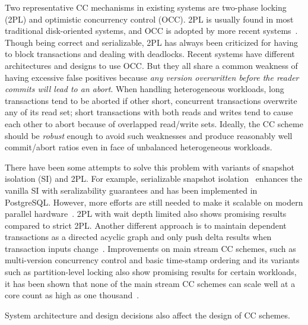 \documentclass[preprint]{sig-alternate-nocprt}
\begin{document}
Two representative CC mechanisms in existing systems are two-phase locking (2PL) and optimistic concurrency control (OCC). 2PL is usually found in most traditional disk-oriented systems, and OCC is adopted by more recent systems~\cite{Hekaton,Silo}. Though being correct and serializable, 2PL has always been criticized for having to block transactions and dealing with deadlocks. Recent systems have different architectures and designs to use OCC. But they all share a common weakness of having excessive false positives because \textit{any version overwritten before the reader commits will lead to an abort}. When handling heterogeneous workloads, long transactions tend to be aborted if other short, concurrent transactions overwrite any of its read set; short transactions with both reads and writes tend to cause each other to abort because of overlapped read/write sets. Ideally, the CC scheme should be \textit{robust} enough to avoid such weaknesses and produce reasonably well commit/abort ratios even in face of unbalanced heterogeneous workloads.

There have been some attempts to solve this problem with variants of snapshot isolation (SI) and 2PL. For example, serializable snapshot isolation~\cite{SSI} enhances the vanilla SI with seralizability guarantees and has been implemented in PostgreSQL. However, more efforts are still needed to make it scalable on modern parallel hardware~\cite{ScalableSSI}. 2PL with wait depth limited also shows promising results compared to strict 2PL. Another different approach is to maintain dependent transactions as a directed acyclic graph and only push delta results when transaction inputs change~\cite{LogicBlox}. Improvements on main stream CC schemes, such as multi-version concurrency control and basic time-stamp ordering and its variants such as partition-level locking also show promising results for certain workloads, it has been shown that none of the main stream CC schemes can scale well at a core count as high as one thousand~\cite{CCAbyss}.

System architecture and design decisions also affect the design of CC schemes.

\end{document}
